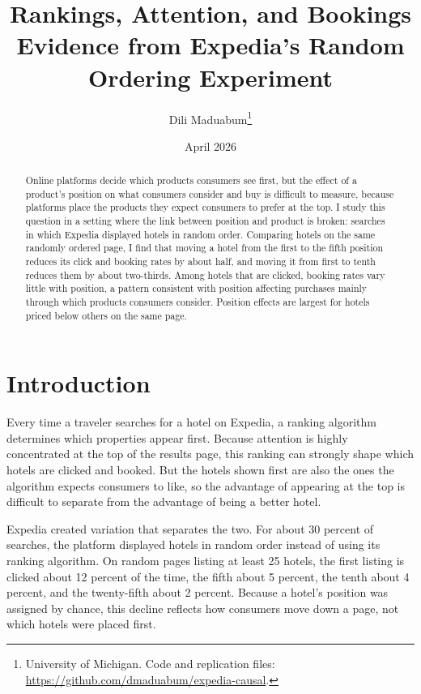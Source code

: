 \documentclass[12pt]{article}
\title{\textbf{Rankings, Attention, and Bookings}\\[4pt]
       \large Evidence from Expedia's Random Ordering Experiment}
\author{Dili Maduabum\thanks{University of Michigan. Code and replication files: \url{https://github.com/dmaduabum/expedia-causal}.}}
\date{April 2026}
\begin{document}
\maketitle

\begin{abstract}
\noindent
Online platforms decide which products consumers see first, but the effect of a product's position on what consumers consider and buy is difficult to measure, because platforms place the products they expect consumers to prefer at the top. I study this question in a setting where the link between position and product is broken: searches in which Expedia displayed hotels in random order. Comparing hotels on the same randomly ordered page, I find that moving a hotel from the first to the fifth position reduces its click and booking rates by about half, and moving it from first to tenth reduces them by about two-thirds. Among hotels that are clicked, booking rates vary little with position, a pattern consistent with position affecting purchases mainly through which products consumers consider. Position effects are largest for hotels priced below others on the same page.
\end{abstract}

\clearpage

\section{Introduction}

Every time a traveler searches for a hotel on Expedia, a ranking algorithm determines which properties appear first. Because attention is highly concentrated at the top of the results page, this ranking can strongly shape which hotels are clicked and booked. But the hotels shown first are also the ones the algorithm expects consumers to like, so the advantage of appearing at the top is difficult to separate from the advantage of being a better hotel.

Expedia created variation that separates the two. For about 30 percent of searches, the platform displayed hotels in random order instead of using its ranking algorithm. On random pages listing at least 25 hotels, the first listing is clicked about 12 percent of the time, the fifth about 5 percent, the tenth about 4 percent, and the twenty-fifth about 2 percent. Because a hotel's position was assigned by chance, this decline reflects how consumers move down a page, not which hotels were placed first.
\end{document}
